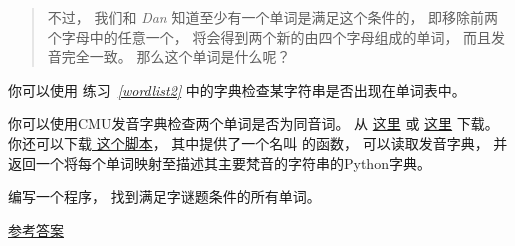 \begin{exercise}
\begin{quote}
不过， 我们和 {\em Dan} 知道至少有一个单词是满足这个条件的， 即移除前两个字母中的任意一个， 将会得到两个新的由四个字母组成的单词， 而且发音完全一致。  那么这个单词是什么呢？

\end{quote}

  


你可以使用 练习~{\em \ref{wordlist2}} 中的字典检查某字符串是否出现在单词表中。


你可以使用CMU发音字典检查两个单词是否为同音词。  从 \href{http://www.speech.cs.cmu.edu/cgi-bin/cmudict}{这里} 或 \href{http://thinkpython2.com/code/c06d}{这里} 下载。   你还可以下载\href{http://thinkpython2.com/code/pronounce.py}{ 这个脚本}， 其中提供了一个名叫  的函数， 可以读取发音字典， 并返回一个将每个单词映射至描述其主要梵音的字符串的Python字典。


编写一个程序， 找到满足字谜题条件的所有单词。

\href{http://thinkpython2.com/code/homophone.py}{参考答案}

\end{exercise}
